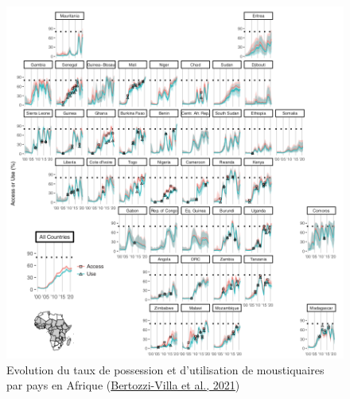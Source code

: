 \documentclass[12pt,twoside]{reedthesis}
\begin{document}
\begin{figure}

{\centering \includegraphics[width=1\linewidth]{figure/itn_access_use2} 

}

\caption[Evolution du taux de possession et d'utilisation de moustiquaires par pays en Afrique]{Evolution du taux de possession et d'utilisation de moustiquaires par pays en Afrique (\protect\hyperlink{ref-bertozzi-villa_maps_2021}{Bertozzi-Villa et al., 2021})}\label{fig:itn-access-use}
\end{figure}
\end{document}
